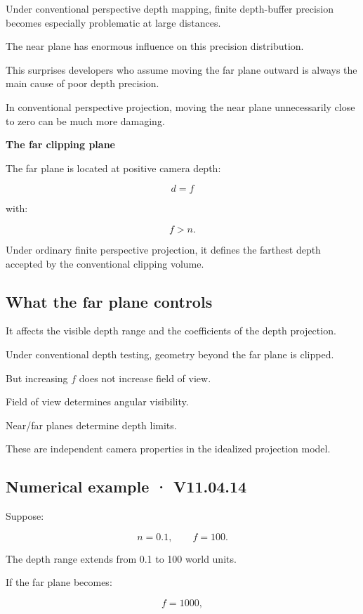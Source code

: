 Under conventional perspective depth mapping, finite depth-buffer precision becomes especially problematic at large distances.

The near plane has enormous influence on this precision distribution.

This surprises developers who assume moving the far plane outward is always the main cause of poor depth precision.

In conventional perspective projection, moving the near plane unnecessarily close to zero can be much more damaging.

\textbf{The far clipping plane}

The far plane is located at positive camera depth:

\[
 \boxed{d=f}
\]

with:

\[
 f>n.
\]

Under ordinary finite perspective projection, it defines the farthest depth accepted by the conventional clipping volume.

\subsection{What the far plane controls}\label{02-foundations-ii-ch033-what-the-far-plane-controls}

It affects the visible depth range and the coefficients of the depth projection.

Under conventional depth testing, geometry beyond the far plane is clipped.

But increasing \(f\) does not increase field of view.

Field of view determines angular visibility.

Near/far planes determine depth limits.

These are independent camera properties in the idealized projection model.

\subsection{Numerical example · V11.04.14}\label{02-foundations-ii-ch033-numerical-example-v11.04.14}

Suppose:

\[
 n=0.1,\qquad f=100.
\]

The depth range extends from 0.1 to 100 world units.

If the far plane becomes:

\[
 f=1000,
\]

